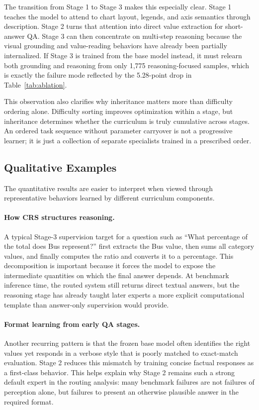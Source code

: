 \documentclass[journal]{IEEEtran}
\newcommand{\crs}{CRS}
\begin{document}
The transition from Stage 1 to Stage 3 makes this especially clear.
Stage 1 teaches the model to attend to chart layout, legends, and axis semantics through description.
Stage 2 turns that attention into direct value extraction for short-answer QA.
Stage 3 can then concentrate on multi-step reasoning because the visual grounding and value-reading behaviors have already been partially internalized.
If Stage 3 is trained from the base model instead, it must relearn both grounding and reasoning from only 1,775 reasoning-focused samples, which is exactly the failure mode reflected by the 5.28-point drop in Table~\ref{tab:ablation}.

This observation also clarifies why inheritance matters more than difficulty ordering alone.
Difficulty sorting improves optimization within a stage, but inheritance determines whether the curriculum is truly cumulative across stages.
An ordered task sequence without parameter carryover is not a progressive learner; it is just a collection of separate specialists trained in a prescribed order.

\subsection{Qualitative Examples}
The quantitative results are easier to interpret when viewed through representative behaviors learned by different curriculum components.

\paragraph{How \crs{} structures reasoning.}
A typical Stage-3 supervision target for a question such as ``What percentage of the total does Bus represent?'' first extracts the Bus value, then sums all category values, and finally computes the ratio and converts it to a percentage.
This decomposition is important because it forces the model to expose the intermediate quantities on which the final answer depends.
At benchmark inference time, the routed system still returns direct textual answers, but the reasoning stage has already taught later experts a more explicit computational template than answer-only supervision would provide.

\paragraph{Format learning from early QA stages.}
Another recurring pattern is that the frozen base model often identifies the right values yet responds in a verbose style that is poorly matched to exact-match evaluation.
Stage 2 reduces this mismatch by training concise factual responses as a first-class behavior.
This helps explain why Stage 2 remains such a strong default expert in the routing analysis: many benchmark failures are not failures of perception alone, but failures to present an otherwise plausible answer in the required format.
\end{document}
